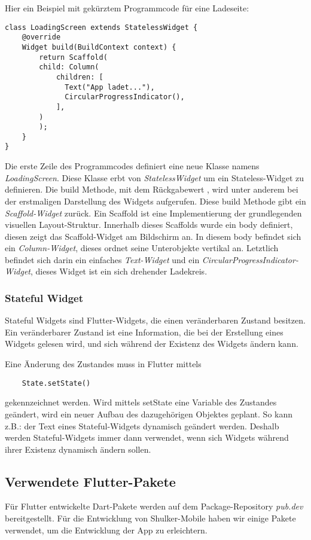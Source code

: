Hier ein Beispiel mit gekürztem Programmcode für eine Ladeseite:
\begin{lstlisting}
class LoadingScreen extends StatelessWidget {
    @override
    Widget build(BuildContext context) {
        return Scaffold(
        child: Column(
            children: [
              Text("App ladet..."),
              CircularProgressIndicator(),
            ],
        )
        );
    }
}
\end{lstlisting}

Die erste Zeile des Programmcodes definiert eine neue Klasse namens \textit{LoadingScreen}.
Diese Klasse erbt von \textit{StatelessWidget} um ein Stateless-Widget zu definieren.
Die build Methode, mit dem Rückgabewert , wird unter anderem bei der erstmaligen
Darstellung des Widgets aufgerufen. \cite{flutterstatelesswidgets}
Diese build Methode gibt ein \textit{Scaffold-Widget} zurück.
Ein Scaffold ist eine Implementierung der grundlegenden visuellen Layout-Struktur. 
Innerhalb dieses Scaffolds wurde ein body definiert, diesen zeigt das Scaffold-Widget am Bildschirm an.
In diesem body befindet sich ein \textit{Column-Widget}, dieses ordnet seine Unterobjekte vertikal an.
Letztlich befindet sich darin ein einfaches \textit{Text-Widget} und ein \textit{CircularProgressIndicator-Widget}, 
dieses Widget ist ein sich drehender Ladekreis. 

\subsubsection{Stateful Widget}
Stateful Widgets sind Flutter-Widgets, die einen veränderbaren Zustand besitzen.
Ein veränderbarer Zustand ist eine Information, die bei der Erstellung eines Widgets
gelesen wird, und sich während der Existenz des Widgets ändern kann.


Eine Änderung des Zustandes muss in Flutter mittels 
\begin{lstlisting}
    State.setState()
\end{lstlisting} gekennzeichnet werden. Wird mittels setState eine Variable des Zustandes geändert,
wird ein neuer Aufbau des dazugehörigen Objektes geplant. So kann z.B.: der Text eines Stateful-Widgets 
dynamisch geändert werden. Deshalb werden Stateful-Widgets immer dann verwendet, wenn sich Widgets während 
ihrer Existenz dynamisch ändern sollen. 

\subsection{Verwendete Flutter-Pakete}
Für Flutter entwickelte Dart-Pakete werden auf dem Package-Repository \textit{pub.dev} bereitgestellt.
Für die Entwicklung von Shulker-Mobile haben wir einige Pakete verwendet, um die Entwicklung der App zu
erleichtern.

